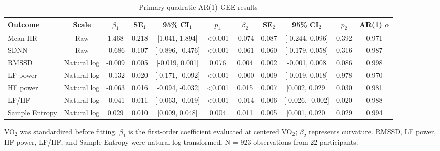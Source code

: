 \begin{table}[htbp]
\centering
\begin{threeparttable}
\begin{tabular}{lcccccccccc}
\toprule
Outcome & Scale & $\beta_1$ & SE$_1$ & 95\% CI$_1$ & $p_1$ & $\beta_2$ & SE$_2$ & 95\% CI$_2$ & $p_2$ & AR(1) $\alpha$ \\
\midrule
Mean HR & Raw & 1.468 & 0.218 & [1.041, 1.894] & <0.001 & -0.074 & 0.087 & [-0.244, 0.096] & 0.392 & 0.971 \\
SDNN & Raw & -0.686 & 0.107 & [-0.896, -0.476] & <0.001 & -0.061 & 0.060 & [-0.179, 0.058] & 0.316 & 0.987 \\
RMSSD & Natural log & -0.009 & 0.005 & [-0.019, 0.001] & 0.076 & 0.004 & 0.002 & [-0.001, 0.008] & 0.086 & 0.998 \\
LF power & Natural log & -0.132 & 0.020 & [-0.171, -0.092] & <0.001 & -0.000 & 0.009 & [-0.019, 0.018] & 0.978 & 0.970 \\
HF power & Natural log & -0.063 & 0.016 & [-0.094, -0.032] & <0.001 & 0.015 & 0.007 & [0.002, 0.029] & 0.030 & 0.981 \\
LF/HF & Natural log & -0.041 & 0.011 & [-0.063, -0.019] & <0.001 & -0.014 & 0.006 & [-0.026, -0.002] & 0.020 & 0.988 \\
Sample Entropy & Natural log & 0.029 & 0.010 & [0.009, 0.048] & 0.004 & 0.011 & 0.005 & [0.001, 0.020] & 0.029 & 0.994 \\
\bottomrule
\end{tabular}\begin{tablenotes}\footnotesize\item VO$_2$ was standardized before fitting. $\beta_1$ is the first-order coefficient evaluated at centered VO$_2$; $\beta_2$ represents curvature. RMSSD, LF power, HF power, LF/HF, and Sample Entropy were natural-log transformed. N = 923 observations from 22 participants.\end{tablenotes}
\end{threeparttable}
\caption{Primary quadratic AR(1)-GEE results}
\label{tab:gee-results}
\end{table}
